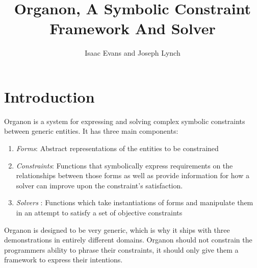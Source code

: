 \documentclass[12pt,a4paper]{article}
\author{Isaac Evans and Joseph Lynch}
\title{Organon, A Symbolic Constraint Framework And Solver}
\begin{document}

\lstset{
 language=Scheme
}

\maketitle

\section{Introduction}
Organon is a system for expressing and solving complex symbolic constraints between generic entities. It has three main components: 
\begin{enumerate}
\item \textit{Forms}: Abstract representations of the entities to be constrained
\item \textit{Constraints}: Functions that symbolically express requirements on the relationships between those forms as well as provide information for how a solver can improve upon the constraint's satisfaction.
\item \textit{Solvers} : Functions which take instantiations of forms and manipulate them in an attempt to satisfy a set of objective constraints
\end{enumerate}

Organon is designed to be very generic, which is why it ships with three demonstrations in entirely different domains.  Organon should not constrain the programmers ability to phrase their constraints, it should only give them a framework to express their intentions.
\end{document}
